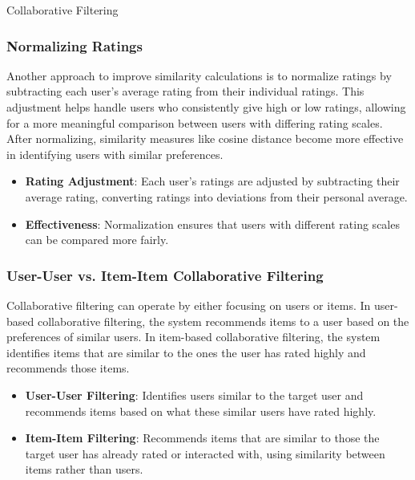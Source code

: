 \begin{notes}{Collaborative Filtering}
    \subsubsection*{Normalizing Ratings}
    
    Another approach to improve similarity calculations is to normalize ratings by subtracting each user's average rating from their individual ratings. This adjustment helps handle users who consistently give high or 
    low ratings, allowing for a more meaningful comparison between users with differing rating scales. After normalizing, similarity measures like cosine distance become more effective in identifying users with similar 
    preferences.
    
    \begin{highlight}
        \begin{itemize}
            \item \textbf{Rating Adjustment}: Each user's ratings are adjusted by subtracting their average rating, converting ratings into deviations from their personal average.
            \item \textbf{Effectiveness}: Normalization ensures that users with different rating scales can be compared more fairly.
        \end{itemize}
    \end{highlight}
    
    \subsubsection*{User-User vs. Item-Item Collaborative Filtering}
    
    Collaborative filtering can operate by either focusing on users or items. In user-based collaborative filtering, the system recommends items to a user based on the preferences of similar users. In item-based 
    collaborative filtering, the system identifies items that are similar to the ones the user has rated highly and recommends those items.
    
    \begin{highlight}
        \begin{itemize}
            \item \textbf{User-User Filtering}: Identifies users similar to the target user and recommends items based on what these similar users have rated highly.
            \item \textbf{Item-Item Filtering}: Recommends items that are similar to those the target user has already rated or interacted with, using similarity between items rather than users.
        \end{itemize}
    \end{highlight}
    

\end{notes}
